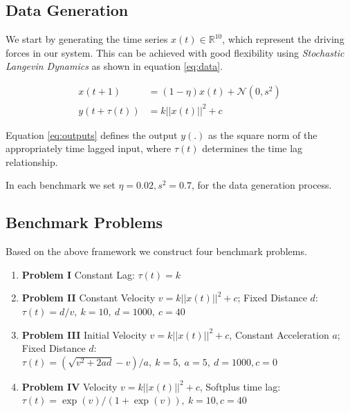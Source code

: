 \documentclass[envcountsect,runningheads]{llncs}
\theoremstyle{etoile}
\begin{document}
\subsection{Data Generation}

We start by generating the time series $x(t) \in \mathbb{R}^10$, 
which represent the driving forces in our system. This can be achieved with 
good flexibility using \emph{Stochastic Langevin Dynamics} as shown in 
equation \ref{eq:data}.

\begin{align}
 x(t + 1) &= (1 - \eta) x(t) + \mathcal{N}(0, s^2) \label{eq:data}\\
 y(t + \tau(t)) &= k ||x(t)||^2 + c \label{eq:outputs}
\end{align}

Equation \ref{eq:outputs} defines the output $y(.)$ as the square norm of the appropriately 
time lagged input, where $\tau(t)$ determines the time lag relationship.

In each benchmark we set $\eta = 0.02, s^2 = 0.7$, for the data generation process.


\subsection{Benchmark Problems}\label{sec:benchmark}

Based on the above framework we construct four benchmark problems.

\begin{enumerate}
\item \textbf{Problem I} Constant Lag: \newline 
$\tau(t) = k$

\item \textbf{Problem II} Constant Velocity $v = k ||x(t)||^2 + c$; Fixed Distance $d$: 
\newline $\tau(t) = d/v,\ k = 10,\ d = 1000,\ c = 40$

\item \textbf{Problem III} Initial Velocity $v = k ||x(t)||^2 + c$, Constant Acceleration $a$; Fixed Distance $d$: 
\newline $\tau(t) = (\sqrt{v^2 + 2ad} - v)/a,\ k = 5,\ a = 5,\ d = 1000, c = 0$

\item \textbf{Problem IV} Velocity $v = k ||x(t)||^2 + c$, Softplus time lag: 
\newline $\tau(t) = \exp\left(v\right)/\left(1 + \exp(v)\right), \ k = 10, c = 40$

\end{enumerate}
\end{document}
